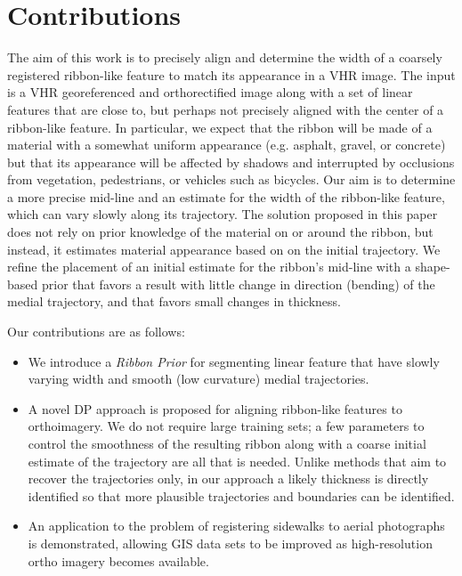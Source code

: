 \section{Contributions}\label{sec:contributions}

The aim of this work is to precisely align and determine the width of a coarsely registered ribbon-like feature to match
its appearance in a \ac{VHR} image. The input is a \ac{VHR} georeferenced and orthorectified image along with a set of
linear features that are close to, but perhaps not precisely aligned with the center of a ribbon-like feature. In
particular, we expect that the ribbon will be made of a material with a somewhat uniform appearance (e.g. asphalt,
gravel, or concrete) but that its appearance will be affected by shadows and interrupted by occlusions from vegetation,
pedestrians, or vehicles such as bicycles. Our aim is to determine a more precise mid-line and an estimate for the width
of the ribbon-like feature, which can vary slowly along its trajectory. The solution proposed in this paper does not
rely on prior knowledge of the material on or around the ribbon, but instead, it estimates material appearance based on
on the initial trajectory. We
refine the placement of an initial estimate for the ribbon's mid-line with a shape-based prior that favors a result with little 
change in direction (bending) of the medial trajectory, and that favors small changes in thickness.

Our contributions are as follows: 
\begin{itemize} 
\item We introduce a \textit{Ribbon Prior} for segmenting linear feature that have slowly varying
      width and smooth (low curvature) medial trajectories. 
\item A novel \ac{DP} approach is proposed for aligning ribbon-like features to orthoimagery. 
    We do not require large training sets; a few parameters to control the smoothness of
	the resulting ribbon along with a coarse initial estimate of the trajectory are all that is needed. 
	Unlike
	methods that aim to recover the trajectories only, in our approach a likely thickness is directly identified so that
	more plausible trajectories and boundaries can be identified. 
\item An application to the problem of registering
	sidewalks to aerial photographs is demonstrated, allowing \ac{GIS} data sets to be improved as high-resolution ortho
	imagery becomes available. 
\end{itemize}
